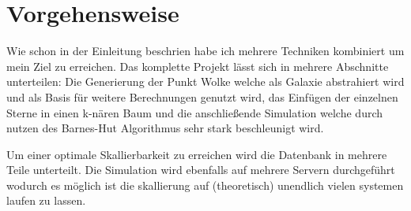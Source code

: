 \section{Vorgehensweise}
Wie schon in der Einleitung beschrien habe ich mehrere Techniken kombiniert um
mein Ziel zu erreichen. Das komplette Projekt lässt sich in mehrere Abschnitte
unterteilen: Die Generierung der Punkt Wolke welche als Galaxie abstrahiert
wird und als Basis für weitere Berechnungen genutzt wird, das Einfügen der
einzelnen Sterne in einen k-nären Baum und die anschließende Simulation welche
durch nutzen des Barnes-Hut Algorithmus sehr stark beschleunigt wird.

\par Um einer optimale Skallierbarkeit zu erreichen wird die Datenbank in
mehrere Teile unterteilt. Die Simulation wird ebenfalls auf mehrere Servern
durchgeführt wodurch es möglich ist die skallierung auf (theoretisch) unendlich
vielen systemen laufen zu lassen.
